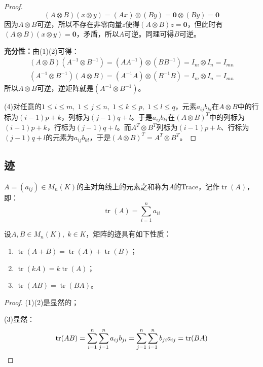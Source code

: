 \begin{proof}
\begin{equation*}
		(A\otimes B)(x\otimes y)=(Ax)\otimes(By)=\mathbf{0}\otimes(By)=\mathbf{0}
	\end{equation*}
	因为$A\otimes B$可逆，所以不存在非零向量$z$使得$(A\otimes B)z=\mathbf{0}$，但此时有$(A\otimes B)(x\otimes y)=\mathbf{0}$，矛盾，所以$A$可逆。同理可得$B$可逆。\par
	\textbf{充分性：}由(1)(2)可得：
	\begin{gather*}
		(A\otimes B)(A^{-1}\otimes B^{-1})=(AA^{-1})\otimes(BB^{-1})=I_m\otimes I_n=I_{mn} \\
		(A^{-1}\otimes B^{-1})(A\otimes B)=(A^{-1}A)\otimes(B^{-1}B)=I_m\otimes I_n=I_{mn}
	\end{gather*}
	所以$A\otimes B$可逆，逆矩阵就是$(A^{-1}\otimes B^{-1})$。\par
	(4)对任意的$1\leqslant i\leqslant m,\;1\leqslant j\leqslant n,\;1\leqslant k\leqslant p,\;1\leqslant l\leqslant q$，元素$a_{ij}b_{kl}$在$A\otimes B$中的行标为$(i-1)p+k$，列标为$(j-1)q+l$。于是$a_{ij}b_{kl}$在$(A\otimes B)^T$中的列标为$(i-1)p+k$，行标为$(j-1)q+l$。而$A^T\otimes B^T$列标为$(i-1)p+k$、行标为$(j-1)q+l$的元素为$a_{ij}b_{kl}$，于是$(A\otimes B)^T=A^T\otimes B^T$。
\end{proof}
\subsection{迹}
\begin{definition}
	$A=(a_{ij})\in M_{n}(K)$的主对角线上的元素之和称为$A$的\gls{Trace}，记作$\operatorname{tr}(A)$，即：
	\begin{equation*}
		\operatorname{tr}(A)=\sum_{i=1}^{n}a_{ii}
	\end{equation*}
\end{definition}
\begin{property}\label{prop:Trace}
	设$A,B\in M_{n}(K),\;k\in K$，矩阵的迹具有如下性质：
	\begin{enumerate}
		\item $\operatorname{tr}(A+B)=\operatorname{tr}(A)+\operatorname{tr}(B)$；
		\item $\operatorname{tr}(kA)=k\operatorname{tr}(A)$；
		\item $\operatorname{tr}(AB)=\operatorname{tr}(BA)$。
	\end{enumerate}
\end{property}
\begin{proof}
	(1)(2)是显然的；\par
	(3)显然：
	\begin{gather*}
		\operatorname{tr}(AB)=\sum_{i=1}^{n}\sum_{j=1}^{n}a_{ij}b_{ji}=\sum_{j=1}^{n}\sum_{i=1}^{n}b_{ji}a_{ij}=\operatorname{tr}(BA)\qedhere
	\end{gather*}
\end{proof}
